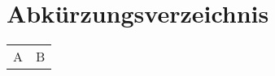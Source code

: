 \chapter*{Abkürzungsverzeichnis}
\thispagestyle{plain}

\begin{table}[ht]

\begin{tabularx}{\textwidth}{lX}
         A	&	B	\\


    \end{tabularx}

    \label{tab:my_label4}
\end{table}
